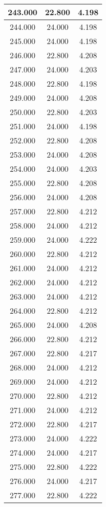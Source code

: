 \begin{longtable}[c]{|c|c|c|}
243.000	&22.800&4.198  \\ \hline 	
244.000	&24.000&4.198  \\ \hline 	
245.000	&24.000&4.198  \\ \hline 	
246.000	&22.800&4.208  \\ \hline 	
247.000	&24.000&4.203  \\ \hline 	
248.000	&22.800&4.198  \\ \hline 	
249.000	&24.000&4.208  \\ \hline 	
250.000	&22.800&4.203  \\ \hline 	
251.000	&24.000&4.198  \\ \hline 	
252.000	&22.800&4.208  \\ \hline 	
253.000	&24.000&4.208  \\ \hline 	
254.000	&24.000&4.203  \\ \hline 	
255.000	&22.800&4.208  \\ \hline 	
256.000	&24.000&4.208  \\ \hline 	
257.000	&22.800&4.212  \\ \hline 	
258.000	&24.000&4.212  \\ \hline 	
259.000	&24.000&4.222  \\ \hline 	
260.000	&22.800&4.212  \\ \hline 	
261.000	&24.000&4.212  \\ \hline 	
262.000	&24.000&4.212  \\ \hline 	
263.000	&24.000&4.212  \\ \hline 	
264.000	&22.800&4.212  \\ \hline 	
265.000	&24.000&4.208  \\ \hline 	
266.000	&22.800&4.212  \\ \hline 	
267.000	&22.800&4.217  \\ \hline 	
268.000	&24.000&4.212  \\ \hline 	
269.000	&24.000&4.212  \\ \hline 	
270.000	&22.800&4.212  \\ \hline 	
271.000	&24.000&4.212  \\ \hline 	
272.000	&22.800&4.217  \\ \hline 	
273.000	&24.000&4.222  \\ \hline 	
274.000	&24.000&4.217  \\ \hline 	
275.000	&22.800&4.222  \\ \hline 	
276.000	&24.000&4.217  \\ \hline 	
277.000	&22.800&4.222  \\ \hline 	

\end{longtable}
